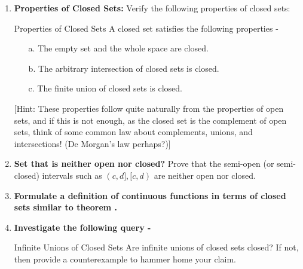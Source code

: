 \exercise
\begin{enumerate}[label=\textbf{\arabic*.}]
    \item \textbf{Properties of Closed Sets:} Verify the following properties of closed sets:
    \begin{Theorem}{Properties of Closed Sets}\label{closed_sets_properties}
    A closed set satisfies the following properties -
        \begin{enumerate}
            \item[a.] The empty set and the whole space are closed.
            \item[b.] The arbitrary intersection of closed sets is closed.
            \item[c.] The finite union of closed sets is closed.
    \end{enumerate}
    \end{Theorem}
    [Hint: These properties follow quite naturally from the properties of open sets, and if this is not enough, as the closed set is the complement of open sets, think of some common law about complements, unions, and intersections! (De Morgan's law perhaps?)]
    \item \textbf{Set that is neither open nor closed?} Prove that the semi-open (or semi-closed) intervals such as $(c,d],[c,d)$ are neither open nor closed.
    \item \textbf{Formulate a definition of continuous functions in terms of closed sets similar to theorem \pmb{\eqref{con_metric_open}}.}\newline [Hint: Prove that $f^{-1}(A^c)=\big(f^{-1}(A)\big)^c$. Then the rest should be easy sailing.]
    \item \textbf{Investigate the following query -}
    \begin{Query}{Infinite Unions of Closed Sets}
        Are infinite unions of closed sets closed? If not, then provide a counterexample to hammer home your claim.
    \end{Query}
\end{enumerate}
